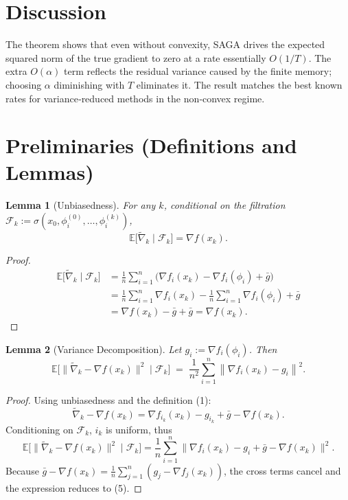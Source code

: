 \documentclass{article}
\newtheorem{lemma}{Lemma}
\newcommand{\E}{\mathbb{E}}
\newcommand{\grad}{\nabla}
\newcommand{\norm}[1]{\left\|#1\right\|}
\begin{document}
\section*{Discussion}
The theorem shows that even without convexity, SAGA drives the expected squared norm of the true gradient to zero at a rate essentially $O(1/T)$. The extra $O(\alpha)$ term reflects the residual variance caused by the finite memory; choosing $\alpha$ diminishing with $T$ eliminates it. The result matches the best known rates for variance‑reduced methods in the non‑convex regime.

\section*{Preliminaries (Definitions and Lemmas)}
\begin{lemma}[Unbiasedness]\label{lem:unbiased}
For any $k$, conditional on the filtration $\mathcal{F}_k:=\sigma(x_0,\phi_i^{(0)},\dots,\phi_i^{(k)})$,
\[
\E\bigl[\widetilde{\nabla}_k\mid\mathcal{F}_k\bigr]=\grad f(x_k).
\]
\end{lemma}
\begin{proof}
\begin{align*}
\E\!\bigl[\widetilde{\nabla}_k\mid\mathcal{F}_k\bigr]
&=\frac1n\sum_{i=1}^{n}\bigl(\grad f_i(x_k)-\grad f_i(\phi_i)+\bar g\bigr)\\
&=\frac1n\sum_{i=1}^{n}\grad f_i(x_k)-\frac1n\sum_{i=1}^{n}\grad f_i(\phi_i)+\bar g\\
&=\grad f(x_k)-\bar g+\bar g=\grad f(x_k).
\end{align*}
\end{proof}

\begin{lemma}[Variance Decomposition]\label{lem:var}
Let $g_i:=\grad f_i(\phi_i)$. Then
\[
\E\!\bigl[\|\widetilde{\nabla}_k-\grad f(x_k)\|^{2}\mid\mathcal{F}_k\bigr]
\;=\;
\frac{1}{n^{2}}\sum_{i=1}^{n}\norm{\grad f_i(x_k)-g_i}^{2}.
\tag{5}
\]
\end{lemma}
\begin{proof}
Using unbiasedness and the definition (1):
\[
\widetilde{\nabla}_k-\grad f(x_k)
= \grad f_{i_k}(x_k)-g_{i_k}+\bar g-\grad f(x_k).
\]
Conditioning on $\mathcal{F}_k$, $i_k$ is uniform, thus
\[
\E\!\bigl[\|\widetilde{\nabla}_k-\grad f(x_k)\|^{2}\mid\mathcal{F}_k\bigr]
= \frac1n\sum_{i=1}^{n}\bigl\|\grad f_i(x_k)-g_i+\bar g-\grad f(x_k)\bigr\|^{2}.
\]
Because $\bar g-\grad f(x_k)=\frac1n\sum_{j=1}^{n}(g_j-\grad f_j(x_k))$, the cross terms cancel and the expression reduces to (5). \qedhere
\end{proof}
\end{document}
